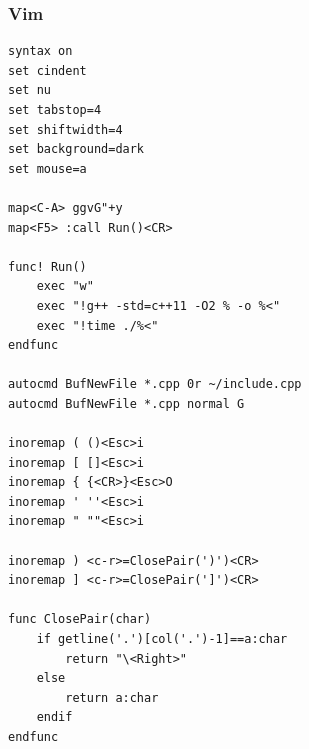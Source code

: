 \documentclass[twoside]{article}
\begin{document}
\subsubsection{Vim}
\begin{lstlisting}
syntax on
set cindent
set nu
set tabstop=4
set shiftwidth=4
set background=dark
set mouse=a

map<C-A> ggvG"+y
map<F5> :call Run()<CR>

func! Run()
    exec "w"
    exec "!g++ -std=c++11 -O2 % -o %<"
    exec "!time ./%<"
endfunc

autocmd BufNewFile *.cpp 0r ~/include.cpp
autocmd BufNewFile *.cpp normal G

inoremap ( ()<Esc>i
inoremap [ []<Esc>i
inoremap { {<CR>}<Esc>O
inoremap ' ''<Esc>i
inoremap " ""<Esc>i

inoremap ) <c-r>=ClosePair(')')<CR>
inoremap ] <c-r>=ClosePair(']')<CR>

func ClosePair(char)
	if getline('.')[col('.')-1]==a:char
		return "\<Right>"
	else
		return a:char
	endif
endfunc
\end{lstlisting}
\end{document}
